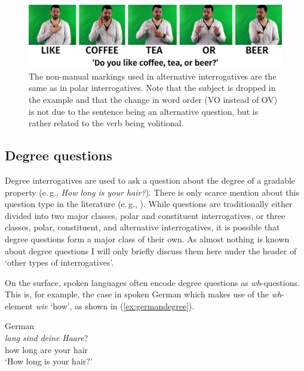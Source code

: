 \begin{figure}[bt]
\centering
	\includegraphics[width=1.0\textwidth]{alternativequestion.jpg}
	\caption{The non-manual markings used in alternative interrogatives are the same as in polar interrogatives. Note that the subject is dropped in the example and that the change in word order (VO instead of OV) is not due to the sentence being an alternative question, but is rather related to the verb being volitional.}
	\label{alternativequestion}
\end{figure}



\subsection{Degree questions}
Degree interrogatives are used to ask a question about the degree of a gradable property (e.\,g., \textit{How long is your hair?}). There is only scarce mention about this question type in the literature (e.\,g., \citealt{meier2001result, abrusan2011wh, tiemann2012crosslinguistic}). While questions are traditionally either divided into two major classes, polar and constituent interrogatives, or three classes, polar, constituent, and alternative interrogatives, it is possible that degree questions form a major class of their own. As almost nothing is known about degree questions I will only briefly discuss them here under the header of `other types of interrogatives'.

On the surface, spoken languages often encode degree questions as \textit{wh}-questions. This is, for example, the case in spoken German which makes use of the \textit{wh}-element \textit{wie} `how', as shown in (\ref{ex:germandegree}). 

\begin{exe}
\ex German \\  {\textit{lang}} {\textit{sind}} {\textit{deine}} {\textit{Haare}?} \\
{how} {long} {are} {your} {hair} \\
\trans `How long is your hair?' \label{ex:germandegree}
\end{exe} 



